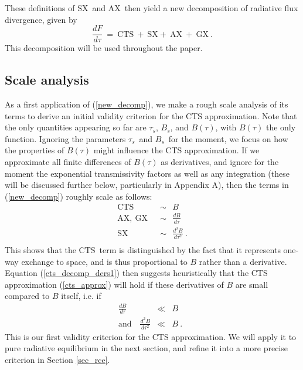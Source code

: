 \documentclass{ametsoc}
\newcommand{\beqn}{\begin{equation}}
\newcommand{\eeqn}{\end{equation}}
\newcommand{\beqa}{\begin{eqnarray}}
\newcommand{\eeqa}{\end{eqnarray}}
\newcommand{\eqnref}[1]{(\ref{#1})}
\newcommand{\der}[2]{\ensuremath{\frac{d #1}{d #2}}}
\newcommand{\ddtau}[1]{\ensuremath{\frac{d #1}{d\tau}}}
\newcommand{\taus}{\ensuremath{\tau_s}}
\newcommand{\Bs}{\ensuremath{B_s}}
\newcommand{\SX}{\ensuremath{\mathrm{SX}}}
\newcommand{\AX}{\ensuremath{\mathrm{AX}}}
\newcommand{\GX}{\ensuremath{\mathrm{GX}}}
\newcommand{\CTS}{\ensuremath{\mathrm{CTS}}}
\begin{document}
These definitions of \SX\ and \AX\ then yield a new decomposition of radiative flux divergence,  given by 
	\beqn
		\ddtau{F} \ = \ \CTS \ + \ \SX + \ \AX \ + \  \GX \  . 
		\label{new_decomp}
	\eeqn
This decomposition will be used throughout the paper.

\subsection{Scale analysis} \label{sec_scale}	
As a first application of \eqnref{new_decomp}, we make a rough scale analysis of its terms to derive an initial validity criterion for the CTS approximation. Note that the only quantities appearing so far are \taus, \Bs, and $B(\tau)$, with $B(\tau)$ the only function. Ignoring the parameters \taus\ and \Bs\ for the moment, we focus on how the properties of  $B(\tau)$ might influence the CTS approximation.  If we approximate all finite differences of $B(\tau)$ as derivatives, and ignore for the moment the exponential transmissivity factors  as well as any integration (these will be discussed further below, particularly in Appendix A), then the terms in \eqnref{new_decomp} roughly scale as follows:
\beqn
	\begin{split}
		\CTS \ & \ \sim \  \ B \\
		\AX, \ \GX	 \ & \ \sim \ \ \frac{d B}{d \tau} \\
		\SX	 \ & \ \sim \ \ \frac{d^2 B}{d \tau^2}  \ .\\
	\end{split}
	\label{cts_decomp_ders1}
\eeqn
This shows that the \CTS\ term is distinguished by the fact that it represents one-way exchange to space, and is thus proportional to $B$ rather than a derivative. Equation \eqnref{cts_decomp_ders1} then suggests heuristically that the CTS approximation \eqnref{cts_approx} will hold if these derivatives of $B$ are small compared to $B$ itself, i.e. if 
\begin{subequations}
	\beqa
		\der{B}{\tau} &  \ll &  B \label{cts_dbdt} \quad  \\
		\text{and} \quad		\frac{d^2 B}{d \tau^2} & \ll & B \ . \label{cts_db2dt2}
	\eeqa
	\label{cts_criterion1}
\end{subequations}
This is our first validity criterion for the CTS approximation. We will apply it to pure radiative equilibrium in the next section, and refine it into a more precise criterion in Section \ref{sec_rce}. 

\end{document}
